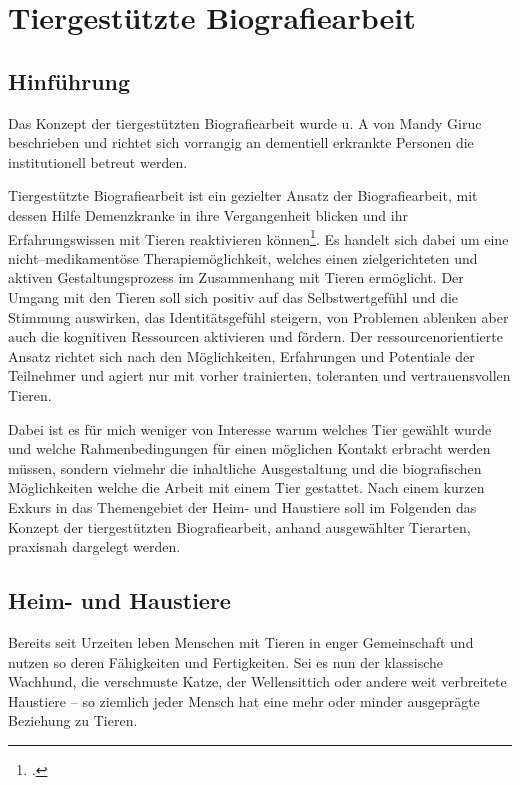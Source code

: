 \section{Tiergestützte Biografiearbeit}
\label{sec:k4_TiergestützteBiografiearbeit}

\subsection{Hinführung}
\label{sec:k4.1_Hinführung}

Das Konzept der tiergestützten Biografiearbeit wurde u. A von Mandy Giruc beschrieben und richtet sich vorrangig an dementiell erkrankte Personen die institutionell betreut werden.

Tiergestützte Biografiearbeit ist ein gezielter Ansatz der Biografiearbeit, mit dessen Hilfe Demenzkranke in ihre Vergangenheit blicken und ihr Erfahrungswissen mit Tieren reaktivieren können\footcite[32f]{Giruc2011}. Es handelt sich dabei um eine nicht--medikamentöse Therapiemöglichkeit, welches einen zielgerichteten und aktiven Gestaltungsprozess im Zusammenhang mit Tieren ermöglicht. Der Umgang mit den Tieren soll sich positiv auf das Selbstwertgefühl und die Stimmung auswirken, das Identitätsgefühl steigern, von Problemen ablenken aber auch die kognitiven Ressourcen aktivieren und fördern. Der ressourcenorientierte Ansatz richtet sich nach den Möglichkeiten, Erfahrungen und Potentiale der Teilnehmer und agiert nur mit vorher trainierten, toleranten und vertrauensvollen Tieren. 

Dabei ist es für mich weniger von Interesse warum welches Tier gewählt wurde und welche Rahmenbedingungen für einen möglichen Kontakt erbracht werden müssen, sondern vielmehr die inhaltliche Ausgestaltung und die biografischen Möglichkeiten welche die Arbeit mit einem Tier gestattet. Nach einem kurzen Exkurs in das Themengebiet der Heim- und Haustiere soll im Folgenden das Konzept der tiergestützten Biografiearbeit, anhand ausgewählter Tierarten, praxisnah dargelegt werden. 

\subsection{Heim- und Haustiere}
\label{sec:k4.2_HeimUndHaustiere}

Bereits seit Urzeiten leben Menschen mit Tieren in enger Gemeinschaft und nutzen so deren Fähigkeiten und Fertigkeiten. Sei es nun der klassische Wachhund, die verschmuste Katze, der Wellensittich oder andere weit verbreitete Haustiere -- so ziemlich jeder Mensch hat eine mehr oder minder ausgeprägte Beziehung zu Tieren. 

